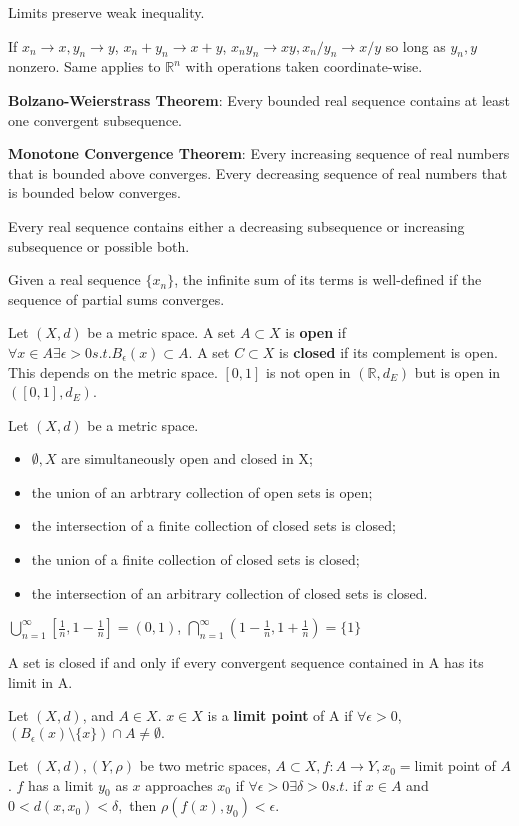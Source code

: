 \documentclass[11pt]{article} %
\begin{document}
Limits preserve weak inequality.

If $x_n \rightarrow x, y_n \rightarrow y$, $x_n + y_n \rightarrow x + y$, $x_ny_n \rightarrow xy, x_n/y_n \rightarrow x/y$ so long as $y_n,y$ nonzero. Same applies to $\mathbb{R}^n$ with operations taken coordinate-wise.

\textbf{Bolzano-Weierstrass Theorem}: Every bounded real sequence contains at least one convergent subsequence.

\textbf{Monotone Convergence Theorem}: Every increasing sequence of real numbers that is bounded above converges. Every decreasing sequence of real numbers that is bounded below converges.

Every real sequence contains either a decreasing subsequence or increasing subsequence or possible both.

Given a real sequence $\{ x_n\}$, the infinite sum of its terms is well-defined if the sequence of partial sums converges.

Let $(X,d)$ be a metric space. A set $A\subset X$ is \textbf{open} if $\forall x \in A \exists \epsilon > 0 s.t. B_\epsilon(x) \subset A.$ A set $C \subset X$ is \textbf{closed} if its complement is open. This depends on the metric space. $[0,1]$ is not open in $(\mathbb{R},d_E)$ but is open in $([0,1],d_E)$.

Let $(X,d)$ be a metric space.
\begin{itemize}
\item $\emptyset,X$ are simultaneously open and closed in X;
\item the union of an arbtrary collection of open sets is open;
\item the intersection of a finite collection of closed sets is closed;
\item the union of a finite collection of closed sets is closed;
\item the intersection of an arbitrary collection of closed sets is closed.
\end{itemize}
$\bigcup_{n=1}^{\infty}\left[ \frac{1}{n}, 1 - \frac{1}{n}\right] = (0,1)$, $\bigcap_{n=1}^{\infty}\left(1- \frac{1}{n}, 1 + \frac{1}{n}\right) = \{1\}$

A set is closed if and only if every convergent sequence contained in A has its limit in A.

Let $(X,d)$, and $A \in X$. $x \in X$ is a \textbf{limit point} of A if $\forall \epsilon > 0,$ $(B_{\epsilon}(x) \setminus \{ x\})\cap A \neq \emptyset.$

Let $(X,d),(Y,\rho)$ be two metric spaces, $A \subset X, f:A \rightarrow Y, x_0 =$limit point of $A$. $f$ has a limit $y_0$ as $x$ approaches $x_0$ if $\forall \epsilon>0 \exists \delta > 0 s.t.$ if $x \in A$ and $0<d(x,x_0) < \delta,$ then $\rho(f(x),y_0) < \epsilon.$
\end{document}

